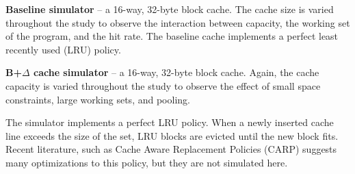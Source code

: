\documentclass[pageno]{jpaper}
\begin{document}
\textbf{Baseline simulator} -- a 16-way, 32-byte block cache. The cache size is varied throughout the study to observe the interaction between capacity, the working set of the program, and the hit rate. The baseline cache implements a perfect least recently used (LRU) policy.

\textbf{B+$\Delta$ cache simulator} -- a 16-way, 32-byte block cache. Again, the cache capacity is varied throughout the study to observe the effect of small space constraints, large working sets, and pooling.

The simulator implements a perfect LRU policy. When a newly inserted cache line exceeds the size of the set, LRU blocks are evicted until the new block fits. Recent literature, such as Cache Aware Replacement Policies\cite{carp} (CARP) suggests many optimizations to this policy, but they are not simulated here.




\end{document}
